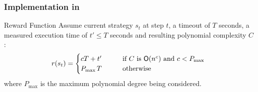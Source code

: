 \documentclass[xcolor=table%
,t]{beamer}
\begin{document}
\begin{frame}
  \frametitle{Implementation in \tct{}}

  \begin{block}{Reward Function%
    } 
    Assume current strategy \(s_{t}\) at step \(t\), a timeout of \(T\) seconds, a measured
    execution time of \(t' \leqslant T\) seconds and resulting polynomial complexity \(C\):
    \begin{align*}
      r(s_{t}) =
      \begin{cases}
        c T + t'    & \qquad   \text{if $C$ is }\mathsf{O}(n^{c}) \text{ and } c < P_{\max{}}\\
        P_{\max{}} T & \qquad \text{otherwise}
      \end{cases}
    \end{align*}
    where \(P_{\max{}}\) is the maximum polynomial degree being considered.
  \end{block}

\end{frame}





\end{document}
